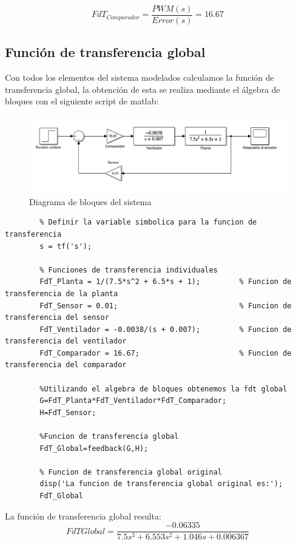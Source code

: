 \documentclass[12pt]{article}
\begin{document}
		\begin{equation}
			FdT_{Comparador}=\frac{PWM(s)}{Error(s)}=16.67
		\end{equation}\newpage

	\subsection{Función de transferencia global}
	Con todos los elementos del sistema modelados calculamos la función de transferencia global, la obtención de esta se realiza mediante el álgebra de bloques con el siguiente script de matlab:
	
	\begin{figure}[h!]
		\centering
		\includegraphics[width=1\linewidth]{Imagenes/Simulink}
		\caption[Diagrama de bloques del sistema]{Diagrama de bloques del sistema}
		\label{fig:simulink}
	\end{figure}
	
	\begin{lstlisting}
		% Definir la variable simbolica para la funcion de transferencia
		s = tf('s');
		
		% Funciones de transferencia individuales
		FdT_Planta = 1/(7.5*s^2 + 6.5*s + 1);         % Funcion de transferencia de la planta
		FdT_Sensor = 0.01;                            % Funcion de transferencia del sensor
		FdT_Ventilador = -0.0038/(s + 0.007);         % Funcion de transferencia del ventilador
		FdT_Comparador = 16.67;                       % Funcion de transferencia del comparador
		
		%Utilizando el algebra de bloques obtenemos la fdt global
		G=FdT_Planta*FdT_Ventilador*FdT_Comparador;
		H=FdT_Sensor;
		
		%Funcion de transferencia global
		FdT_Global=feedback(G,H);
		
		% Funcion de transferencia global original
		disp('La funcion de transferencia global original es:');
		FdT_Global  
	\end{lstlisting}
	
	La función de transferencia global resulta:
	\begin{equation}
		FdT{Global} =\frac{-0.06335}{7.5 s^3+6.553 s^2+1.046s+0.006367}
	\end{equation}
	
\end{document}
